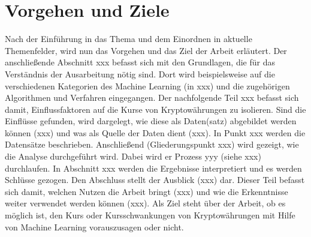 \chapter{Vorgehen und Ziele}\label{chapter:Vorgehen}
Nach der Einführung in das Thema und dem Einordnen in aktuelle Themenfelder, wird nun das Vorgehen und das Ziel der Arbeit erläutert.\newline
Der anschließende Abschnitt xxx befasst sich mit den Grundlagen, die für das Verständnis der Ausarbeitung nötig sind. Dort wird beispielsweise auf die verschiedenen Kategorien des Machine Learning (in xxx) und die zugehörigen Algorithmen und Verfahren eingegangen. Der nachfolgende Teil xxx befasst sich damit, Einflussfaktoren auf die Kurse von Kryptowährungen zu isolieren. Sind die Einflüsse gefunden, wird dargelegt, wie diese als Daten(satz) abgebildet werden können (xxx) und was als Quelle der Daten dient (xxx). In Punkt xxx werden die Datensätze beschrieben. Anschließend (Gliederungspunkt xxx) wird gezeigt, wie die Analyse durchgeführt wird. Dabei wird er Prozess yyy (siehe xxx)  durchlaufen. In Abschnitt xxx werden die Ergebnisse interpretiert und es werden Schlüsse gezogen.  Den Abschluss stellt der Ausblick (xxx) dar. Dieser Teil befasst sich damit, welchen Nutzen die Arbeit bringt (xxx) und wie die Erkenntnisse weiter verwendet werden können (xxx).\newline
{} \newline
{}\newline
{}
Als Ziel steht über der Arbeit, ob es möglich ist, den Kurs oder Kursschwankungen von Kryptowährungen mit Hilfe von Machine Learning vorauszusagen oder nicht. \newline
{}
